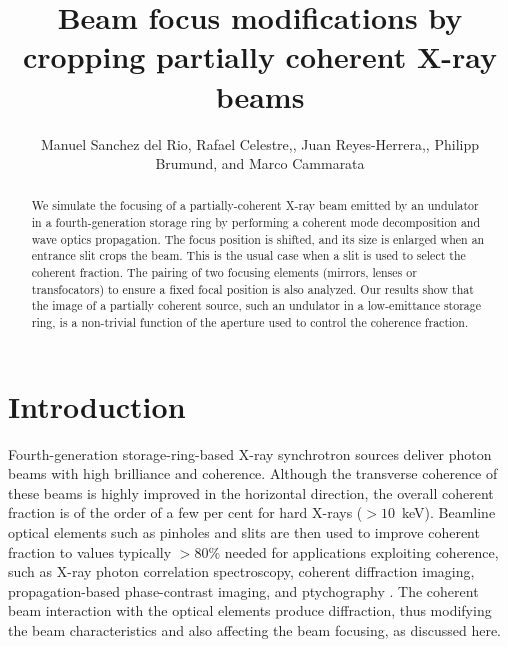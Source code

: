 \documentclass{osa-article}
\begin{document}
\title{Beam focus modifications by cropping partially coherent X-ray beams}

\author{Manuel Sanchez del Rio, Rafael Celestre,, Juan Reyes-Herrera,, Philipp Brumund,  and Marco Cammarata}

\address{European Synchrotron Radiation Facility, 71 Avenue des Martyrs, 38000 Grenoble}




\begin{abstract}
We simulate the focusing of a partially-coherent X-ray beam emitted by an undulator in a fourth-generation storage ring by performing a coherent mode decomposition and wave optics propagation. The focus position is shifted, and its size is enlarged when an entrance slit crops the beam. This is the usual case when a slit is used to select the coherent fraction. The pairing of two focusing elements (mirrors, lenses or transfocators) to ensure a fixed focal position is also analyzed. Our results show that the image of a partially coherent source, such an undulator in a low-emittance storage ring, is a non-trivial function of the aperture used to control the coherence fraction.
\end{abstract}

\section{Introduction}
\label{sec:introduction}
Fourth-generation storage-ring-based X-ray synchrotron sources deliver photon beams with high brilliance and coherence. Although the transverse coherence of these beams is highly improved in the horizontal direction, 
the overall coherent fraction is of the order of a few per cent for hard X-rays ($>10$~keV). Beamline optical elements such as pinholes and slits are then used to improve coherent fraction to values typically $>80 \%$ needed for applications exploiting coherence, such as X-ray photon correlation spectroscopy, coherent diffraction imaging, propagation-based phase-contrast imaging, and ptychography \cite{paganin_book}. The coherent beam interaction with the optical elements produce diffraction, thus modifying the beam characteristics and also affecting the beam focusing, as discussed here.
\end{document}
